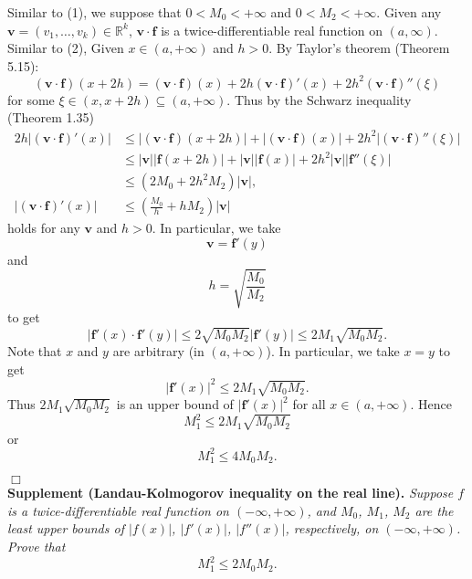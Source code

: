 \documentclass{article}
\begin{document}
\begin{enumerate}
Similar to (1), we suppose that $0 < M_0 < +\infty$ and $0 < M_2 < +\infty$.
Given any $\mathbf{v} = (v_1, \ldots, v_k) \in \mathbb{R}^k$,
$\mathbf{v} \cdot \mathbf{f}$ is a twice-differentiable real function on $(a,\infty)$.
Similar to (2),
Given $x \in (a,+\infty)$ and $h>0$.
By Taylor's theorem (Theorem 5.15):
\[
  (\mathbf{v} \cdot \mathbf{f})(x+2h)
  = (\mathbf{v} \cdot \mathbf{f})(x)
    + 2h (\mathbf{v} \cdot \mathbf{f})'(x)
    + 2 h^2 (\mathbf{v} \cdot \mathbf{f})''(\xi)
\]
for some $\xi \in (x,x+2h) \subseteq (a,+\infty)$.
Thus by the Schwarz inequality (Theorem 1.35)
\begin{align*}
  2h|(\mathbf{v} \cdot \mathbf{f})'(x)|
  &\leq |(\mathbf{v} \cdot \mathbf{f})(x+2h)|
    + |(\mathbf{v} \cdot \mathbf{f})(x)|
    + 2 h^2 |(\mathbf{v} \cdot \mathbf{f})''(\xi)| \\
  &\leq |\mathbf{v}| |\mathbf{f}(x+2h)|
    + |\mathbf{v}||\mathbf{f}(x)|
    + 2 h^2 |\mathbf{v}| |\mathbf{f}''(\xi)| \\
  &\leq (2 M_0 + 2 h^2 M_2)|\mathbf{v}|, \\
  |(\mathbf{v} \cdot \mathbf{f})'(x)|
  &\leq \left(\frac{M_0}{h} + h M_2\right)|\mathbf{v}|
\end{align*}
holds for any $\mathbf{v}$ and $h > 0$.
In particular, we take
\[
  \mathbf{v} = \mathbf{f}'(y)
\]
and
\[
  h = \sqrt{\frac{M_0}{M_2}}
\]
to get
\[
  |\mathbf{f}'(x) \cdot \mathbf{f}'(y)|
  \leq 2 \sqrt{M_0 M_2} |\mathbf{f}'(y)|
  \leq 2 M_1 \sqrt{M_0 M_2}.
\]
Note that $x$ and $y$ are arbitrary (in $(a,+\infty)$).
In particular, we take $x = y$ to get
\[
  |\mathbf{f}'(x)|^2 \leq 2 M_1 \sqrt{M_0 M_2}.
\]
Thus $2 M_1 \sqrt{M_0 M_2}$ is an upper bound of $|\mathbf{f}'(x)|^2$ for all $x \in (a,+\infty)$.
Hence
\[
  M_1^2 \leq 2 M_1 \sqrt{M_0 M_2}
\]
or
\[
  M_1^2 \leq 4 M_0 M_2.
\]
\end{enumerate}
$\Box$ \\

\textbf{Supplement (Landau-Kolmogorov inequality on the real line).}
\emph{Suppose $f$ is a twice-differentiable real function on $(-\infty,+\infty)$,
and $M_0$, $M_1$, $M_2$ are the least upper bounds of
$|f(x)|$, $|f'(x)|$, $|f''(x)|$, respectively, on $(-\infty,+\infty)$.
Prove that
\[
  M_1^2 \leq 2 M_0 M_2.
\]}
\end{document}
